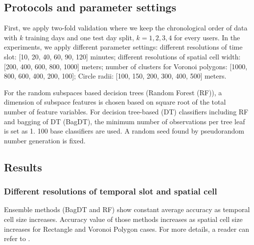 \documentclass{sig-alternate}
\begin{document}
\subsection{Protocols and parameter settings} \label{paramsettings}
First, we apply two-fold validation where we keep the chronological order of data with $k$ training days and one test day split, $k=1,2,3,4$ for every users. In the experiments, we apply different parameter settings: different resolutions of time slot: [10, 20, 40, 60, 90, 120] minutes; different resolutions of spatial cell width: [200, 400, 600, 800, 1000] meters; number of clusters for Voronoi polygons: [1000, 800, 600, 400, 200, 100]; Circle radii: [100, 150, 200, 300, 400, 500] meters.

For the random subspaces based decision trees (Random Forest (RF)), a dimension of subspace features is chosen based on square root of the total number of feature variables. For decision tree-based (DT) classifiers including RF and bagging of DT (BagDT), the minimum number of observations per tree leaf is set as 1. 100 base classifiers are used. A random seed found by pseudorandom number generation is fixed.










\subsection{Results}

\subsubsection{Different resolutions of temporal slot and spatial cell}
Ensemble methods (BagDT and RF) show constant average accuracy as temporal cell size increases. Accuracy value of those methods increases as spatial cell size increases for Rectangle and Voronoi Polygon cases. For more details, a reader can refer to \cite{Kim2014ICPR}.
\end{document}
